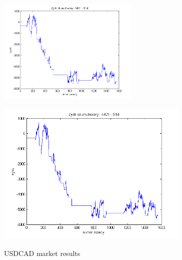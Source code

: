 \documentclass{tewiart}
\begin{document}
\begin{figure}[h]
\begin{minipage}{\linewidth}
\centering
\includegraphics[width=0.6\textwidth]{images/usdcadS1d.png}
\label{mansard}
\end{minipage}
\begin{minipage}{.49\linewidth}
\centering
\includegraphics[width=0.82\textwidth]{images/usdcadS1s.png}
\label{mansard}
\end{minipage}
\caption{USDCAD market results}
\end{figure}




\end{document}
